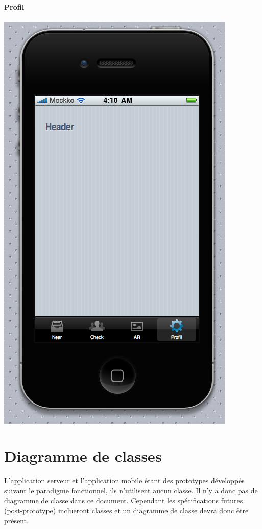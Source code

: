 \documentclass[a4paper,12pt]{report}
\begin{document}
\begin{onehalfspace}
\subsubsection{Profil}
\includegraphics[height=\thehauteurscreen cm]{img/5_profil.png}


\chapter{Diagramme de classes} %
\label{cha:diagramme_de_classes}

L'application serveur et l'application mobile étant des prototypes développés suivant le paradigme fonctionnel, ils n'utilisent aucun classe. Il n'y a donc pas de diagramme de classe dans ce document. Cependant les spécifications futures (post-prototype) inclueront classes et un diagramme de classe devra donc être présent.


\end{onehalfspace}
\end{document}
